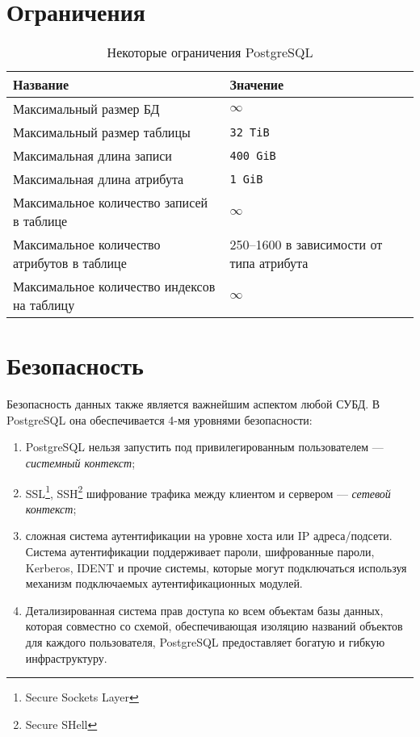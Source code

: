 \documentclass[a4paper,12pt,notitlepage,headsepline,pdftex]{scrartcl}
\begin{document}
  \pagebreak

\section{Ограничения}
  \begin{table}[h]
    \caption{Некоторые ограничения PostgreSQL}\label{tab:limits}
    \begin{tabular}[c]{|p{}|p{}|}
      \hline
      \textbf{Название} & \textbf{Значение}\\
      \hline
      Максимальный размер БД & $\infty$\\
      Максимальный размер таблицы & \verb'32 TiB'\\
      Максимальная длина записи & \verb'400 GiB'\\
      Максимальная длина атрибута & \verb'1 GiB'\\
      Максимальное количество записей в таблице & $\infty$\\
      Максимальное количество атрибутов в таблице & 250--1600 в зависимости от
      типа атрибута\\
      Максимальное количество индексов на таблицу & $\infty$\\
      \hline
    \end{tabular}
  \end{table}
\section{Безопасность}
  Безопасность данных также является важнейшим аспектом любой СУБД.
  В PostgreSQL она обеспечивается 4-мя уровнями безопасности:
  \begin{enumerate}
    \item PostgreSQL нельзя запустить под привилегированным пользователем ---
      \emph{системный контекст};
    \item SSL\footnote{Secure Sockets Layer}, SSH\footnote{Secure SHell}
      шифрование трафика между клиентом и сервером --- \emph{сетевой
      контекст};
    \item сложная система аутентификации на уровне хоста или IP
      адреса/подсети.
      Система аутентификации поддерживает пароли, шифрованные пароли,
      Kerberos, IDENT и прочие системы, которые могут подключаться используя
      механизм подключаемых аутентификационных модулей.
    \item Детализированная система прав доступа ко всем объектам базы данных,
      которая совместно со схемой, обеспечивающая изоляцию названий объектов
      для каждого пользователя, PostgreSQL предоставляет богатую и гибкую
      инфраструктуру.
  \end{enumerate}
  \pagebreak
\end{document}

